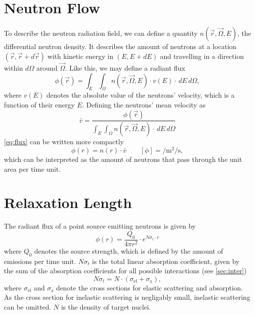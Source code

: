 \section{Neutron Flow}\label{sec:flow}
To describe the neutron radiation field, we can define a quantity $n(\vec{r}, \vec{\Omega}, E)$, the differential neutron density.
It describes the amount of neutrons at a location $(\vec{r}, \vec{r} + d\vec{r})$ with kinetic energy in $(E, E+dE)$ and travelling in a direction within $d\Omega$ around $\vec{\Omega}$.
Like this, we may define a radiant flux
\begin{equation}\label{eq:flux}
	\phi(\vec{r}) = \int_E \int_\Omega n(\vec{r}, \vec{\Omega}, E)\cdot v(E)\cdot \,dE \,d\Omega,
\end{equation}
where $v(E)$ denotes the absolute value of the neutrons' velocity, which is a function of their energy $E$.
Defining the neutrons' mean velocity as
\begin{equation*}
	\bar{v} = \frac{\phi(\vec{r})}{\int_E \int_\Omega n(\vec{r}, \vec{\Omega}, E)\cdot \,dE \,d\Omega}
\end{equation*}
\autoref{eq:flux} can be written more compactly
\begin{equation*}
	\phi(r) = n(r)\cdot \bar{v} \qquad \left[\phi\right]=\si{\per\meter\squared\per\second},
\end{equation*}
which can be interpreted as the amount of neutrons that pass through the unit area per time unit.

\section{Relaxation Length}
The radiant flux of a point source emitting neutrons is given by
\begin{equation}\label{eq:relax}
	\phi(r) = \frac{Q_0}{4\pi r^2}\cdot e^{N\sigma_\text{t}\cdot r}
\end{equation}
where $Q_0$ denotes the source strength, which is defined by the amount of emissions per time unit.
$N\sigma_t$ is the total linear absorption coefficient, given by the sum of the absorption coefficients for all possible interactions (see \autoref{sec:inter})
\begin{equation*}
	N\sigma_t = N\cdot(\sigma_\text{el} + \sigma_\text{a}),
\end{equation*}
where $\sigma_\text{el}$ and $\sigma_\text{a}$ denote the cross sections for elastic scattering and absorption.
As the cross section for inelastic scattering is negligably small, inelastic scattering can be omitted.
$N$ is the density of target nuclei.

